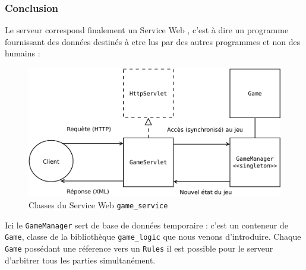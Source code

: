 \subsubsection{Conclusion}
Le serveur correspond finalement un \og Service Web \fg{}, c'est à dire un programme fournissant des données destinés à etre lus par des autres programmes et non des humains :
\begin{figure}[H] 
\centering
\includegraphics[width=\textwidth]{files/env/game_service} 
\caption{Classes du Service Web \texttt{game\_service}} 
\label{game_service}
\end{figure}
Ici le \texttt{GameManager} sert de base de données temporaire : c'est un conteneur de \texttt{Game}, classe de la bibliothèque \texttt{game\_logic} que nous venons d'introduire. Chaque \texttt{Game} possédant une réference vers un \texttt{Rules} il est possible pour le serveur d'arbitrer tous les parties simultanément.